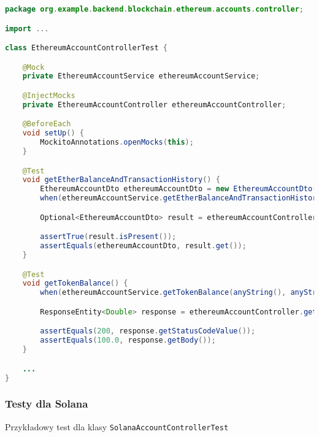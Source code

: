 \begin{lstlisting}[language=Java, style=JavaStyle]
package org.example.backend.blockchain.ethereum.accounts.controller;

import ...

class EthereumAccountControllerTest {

    @Mock
    private EthereumAccountService ethereumAccountService;

    @InjectMocks
    private EthereumAccountController ethereumAccountController;

    @BeforeEach
    void setUp() {
        MockitoAnnotations.openMocks(this);
    }

    @Test
    void getEtherBalanceAndTransactionHistory() {
        EthereumAccountDto ethereumAccountDto = new EthereumAccountDto();
        when(ethereumAccountService.getEtherBalanceAndTransactionHistory(anyString())).thenReturn(Optional.of(ethereumAccountDto));

        Optional<EthereumAccountDto> result = ethereumAccountController.GetEtherBalanceAndTransactionHistory("testAddress");

        assertTrue(result.isPresent());
        assertEquals(ethereumAccountDto, result.get());
    }

    @Test
    void getTokenBalance() {
        when(ethereumAccountService.getTokenBalance(anyString(), anyString())).thenReturn(100.0);

        ResponseEntity<Double> response = ethereumAccountController.getTokenBalance("testAddress", "testContractAddress");

        assertEquals(200, response.getStatusCodeValue());
        assertEquals(100.0, response.getBody());
    }

    ...
}
\end{lstlisting}

\subsubsection{Testy dla Solana}

Przykładowy test dla klasy \texttt{SolanaAccountControllerTest}

